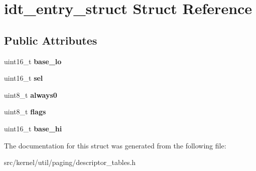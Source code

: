 \hypertarget{structidt__entry__struct}{}\section{idt\+\_\+entry\+\_\+struct Struct Reference}
\label{structidt__entry__struct}
\subsection*{Public Attributes}
\begin{DoxyCompactItemize}
\item 
\mbox{\label{structidt__entry__struct_a4b5fce0881deb4959d33da77d1ed0202}} 
uint16\+\_\+t {\bfseries base\+\_\+lo}
\item 
\mbox{\label{structidt__entry__struct_a3c9321c263139e56901a05efee220047}} 
uint16\+\_\+t {\bfseries sel}
\item 
\mbox{\label{structidt__entry__struct_adc747b3ff87142c71b7b8c51e03c067c}} 
uint8\+\_\+t {\bfseries always0}
\item 
\mbox{\label{structidt__entry__struct_a02277c77564820972ae5df0a37c80be0}} 
uint8\+\_\+t {\bfseries flags}
\item 
\mbox{\label{structidt__entry__struct_af46adb2603d1d8b4a3bedf7f1c6daed4}} 
uint16\+\_\+t {\bfseries base\+\_\+hi}
\end{DoxyCompactItemize}


The documentation for this struct was generated from the following file\+:\begin{DoxyCompactItemize}
\item 
src/kernel/util/paging/descriptor\+\_\+tables.\+h\end{DoxyCompactItemize}
